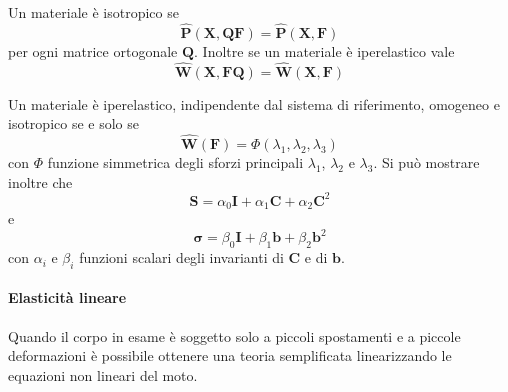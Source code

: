 \documentclass{book}
\begin{document}
Un materiale è isotropico se
$$\widehat{\mathbf{P}}(\mathbf{X},\mathbf{Q}\mathbf{F}) = \widehat{\mathbf{P}}(\mathbf{X},\mathbf{F}) $$
per ogni matrice ortogonale $\mathbf{Q}$.
Inoltre se un materiale è iperelastico vale 
$$\widehat{\mathbf{W}}(\mathbf{X},\mathbf{F}\mathbf{Q}) = \widehat{\mathbf{W}}(\mathbf{X},\mathbf{F}) $$

Un materiale è iperelastico, indipendente dal sistema di riferimento, omogeneo e isotropico se e solo se
$$\widehat{\mathbf{W}}(\mathbf{F}) = \Phi(\lambda_1,\lambda_2,\lambda_3) $$
con $\Phi$ funzione simmetrica degli sforzi principali $\lambda_1$, $\lambda_2$ e $\lambda_3$.
Si può mostrare inoltre che
$$\mathbf{S}=\alpha_0\mathbf{I}+\alpha_1\mathbf{C}+\alpha_2\mathbf{C}^2 $$
e
$$\boldsymbol{\sigma}=\beta_0\mathbf{I}+\beta_1\mathbf{b}+\beta_2\mathbf{b}^2 $$
con $\alpha_i$ e $\beta_i$ funzioni scalari degli invarianti di $\mathbf{C}$  e di $\mathbf{b}$.
\paragraph{Elasticità lineare}
Quando il corpo in esame è soggetto solo a piccoli spostamenti e a piccole deformazioni è possibile ottenere una teoria semplificata linearizzando le equazioni non lineari del moto.
\end{document}

